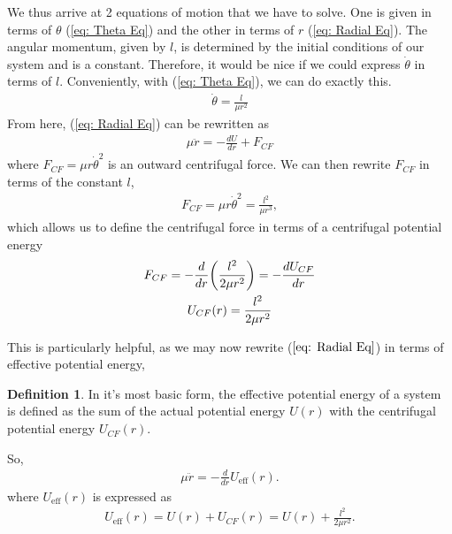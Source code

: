 \documentclass[10pt, psamsfonts]{amsart}
\theoremstyle{definition}
\newtheorem{defn}[thm]{Definition}
\theoremstyle{remark}
\numberwithin{equation}{section}
\begin{document}
We thus arrive at 2 equations of motion that we have to solve. One is given in terms of $\theta$ (\ref{eq: Theta Eq}) and the other in terms of $r$ (\ref{eq: Radial Eq}). The angular momentum, given by $l$, is determined by the initial conditions of our system and is a constant. Therefore, it would be nice if we could express $\dot{\theta}$ in terms of $l$. Conveniently, with (\ref{eq: Theta Eq}), we can do exactly this.
\begin{align}
  \label{eq:Angular Momentum in l}
  \dot{\theta} = \frac{l}{\mu r^2} 
\end{align}
From here,
(\ref{eq: Radial Eq}) can be rewritten as 
\begin{align*}
  \label{eq:}
  \mu \ddot{r} = -\frac{dU}{dr} + F_{CF}
\end{align*}
where $F_{CF} = \mu r \dot{\theta}^2$ is an outward centrifugal force. We can then rewrite $F_{CF}$ in terms of the constant $l$,
\begin{gather*}
  F_{CF} = \mu r \dot{\theta}^2 = \frac{l^2}{\mu r^3},
\end{gather*}
which allows us to define the centrifugal force in terms of a centrifugal potential energy 
\begin{gather}
    \label{eq:centrifugal potential}
  F_{CF} = -\frac{d}{dr} \bigg(\frac{l^2}{2\mu r^2}  \bigg) =  -\frac{dU_{CF}}{dr} \notag\\
  U_{CF}(r) = \frac{l^2}{2\mu r^2} 
\end{gather}

This is particularly helpful, as we may now rewrite ($\ref{eq: Radial Eq}$) in terms of effective potential energy,
\begin{defn}
  In it's most basic form, the effective potential energy of a system is defined as the sum of the actual potential energy $U(r)$ with the centrifugal potential energy $U_{CF}(r)$.
\end{defn}
So, 
\begin{align}
  \label{eq:Final Result}
  \mu \ddot{r} = -\frac{d}{dr} U_{\text{eff}}(r).
\end{align}
where $U_{\text{eff}}(r)$ is expressed as
\begin{align}
  \label{eq: Effective Potential}
  U_{\text{eff}}(r) = U(r) + U_{CF}(r) = U(r) + \frac{l^2}{2\mu r^2}. 
\end{align}
\end{document}
